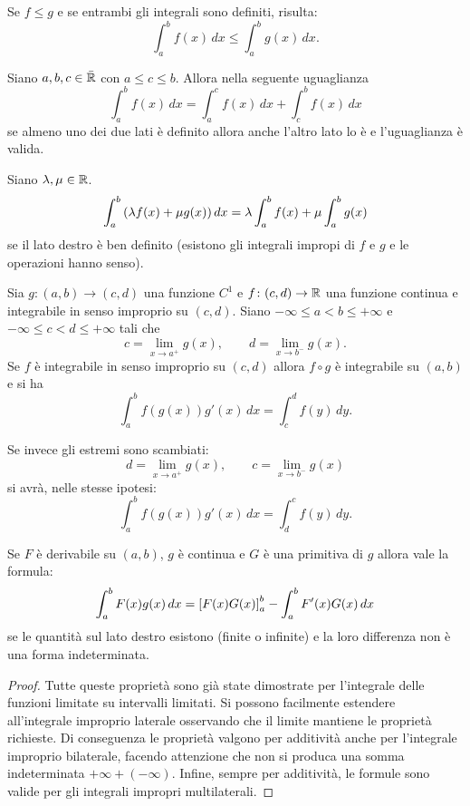 \begin{theorem}
\label{th:proprieta_integrale_improprio}
Se $f\le g$ e se entrambi gli integrali sono definiti, risulta:
%
%
%
\[
  \int_a^b f(x)\, dx \le \int_a^b g(x)\, dx.
\]

Siano $a,b,c \in \bar {{\mathbb R}}$ con $a\le c \le b$.
Allora nella seguente uguaglianza
%
%
%
\[
  \int_a^b f(x)\, dx = \int_a^c f(x)\, dx + \int_c^b f(x)\, dx
\]
se almeno uno dei due lati è definito allora anche l'altro lato lo è e
l'uguaglianza è valida.

Siano $\lambda, \mu \in {\mathbb R}$.
%
%
%
\[
  \int_a^b {\left( \lambda f(x) + \mu g(x) \right)}\, dx
  = \lambda \int_a^b f(x) + \mu \int_a^b g(x)
\]
se il lato destro è ben definito (esistono gli integrali impropi di $f$ e $g$
e le operazioni hanno senso).

Sia $g\colon (a,b)\to (c,d)$ una funzione $C^1$
e $f\colon (c,d) \to {\mathbb R}$ una funzione continua
e integrabile in senso improprio su $(c,d)$.
Siano $-\infty \le a < b \le +\infty$ e
$-\infty \le c < d \le +\infty$ tali che
\[
c = \lim_{x\to a^+} g(x),
\qquad
d = \lim_{x\to b^-} g(x).
\]
Se $f$ è integrabile in senso improprio su $(c,d)$
allora $f \circ g$ è integrabile su $(a,b)$ e
si ha
%
%
%
\[
\int_a^b f(g(x)) g'(x)\, dx = \int_c^d f(y)\, dy.
\]

Se invece gli estremi sono scambiati:
\[
d = \lim_{x\to a^+} g(x),
\qquad
c = \lim_{x\to b^-} g(x)
\]
si avrà, nelle stesse ipotesi:
\[
  \int_a^b f(g(x)) g'(x) \, dx = \int_d^c f(y)\, dy.
\]

Se $F$ è derivabile su $(a,b)$, $g$ è continua 
e $G$ è una primitiva di $g$ allora vale la formula:
%
%
%
\[
 \int_a^b F(x)g(x)\, dx = {\left[ F(x) G(x) \right]}_a^b - \int_a^b F'(x)G(x)\, dx  
\]
se le quantità sul lato destro esistono (finite o infinite) e la loro 
differenza non è una forma indeterminata.
\end{theorem}
%
\begin{proof}
Tutte queste proprietà sono già state dimostrate per l'integrale delle funzioni
limitate su intervalli limitati. Si possono facilmente estendere all'integrale
improprio laterale osservando che il limite mantiene le proprietà richieste.
Di conseguenza le proprietà valgono per additività anche per l'integrale
improprio bilaterale, facendo attenzione che non si produca una somma
indeterminata $+\infty + (-\infty)$.
Infine, sempre per additività, le formule sono valide per gli integrali
impropri multilaterali.
\end{proof}

